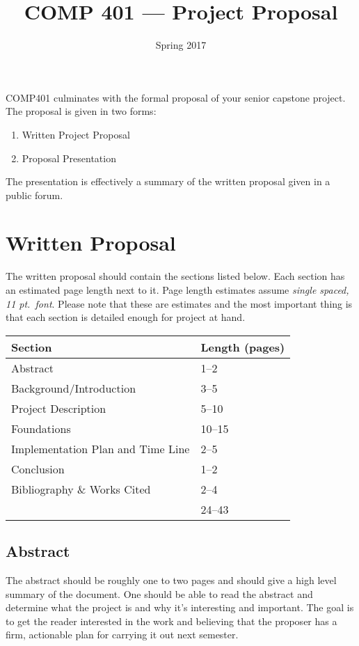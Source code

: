 \documentclass[10pt]{article}
\title{COMP 401 --- Project Proposal}
\author{  }
\date{Spring 2017}
\begin{document}
\maketitle

COMP401 culminates with the formal proposal of your senior capstone project.  The proposal is given in two forms:
\begin{enumerate}
\item Written Project Proposal
\item Proposal Presentation
\end{enumerate}
The presentation is effectively a summary of the written proposal given in a public forum.

\section{Written Proposal}

The written proposal should contain the sections listed below.  Each section has an estimated page length next to it.  Page length estimates assume \textit{single spaced, 11 pt.\ font}.  Please note that these are estimates and the most important thing is that each section is detailed enough for project at hand.
\begin{center}
\begin{tabular}{ll}
  Section & Length (pages) \\ \toprule
  Abstract & 1--2 \\
  Background/Introduction  & 3--5 \\
  Project Description  & 5--10 \\
  Foundations & 10--15 \\
  Implementation Plan and Time Line & 2--5 \\
  Conclusion & 1--2 \\
  Bibliography \& Works Cited & 2--4 \\ \midrule
   & 24--43
\end{tabular}
\end{center}

\subsection{Abstract}

The abstract should be roughly one to two pages and should give a high level summary of the document.  One should be able to read the abstract and determine what the project is and why it's interesting and important.  The goal is to get the reader interested in the work and believing that the proposer has a firm, actionable plan for carrying it out next semester.
\end{document}
